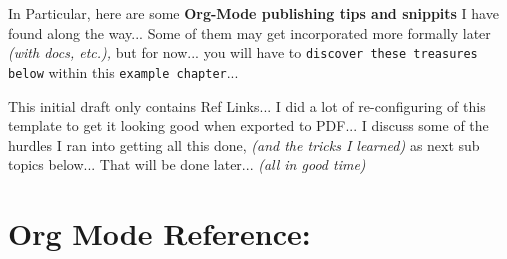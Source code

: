 \documentclass[openleft,oneside,showtrims]{memoir}
\begin{document}
In Particular, here are some \textbf{Org-Mode publishing tips and snippits} I have found along the way...  Some of them may get incorporated more formally later \emph{(with docs, etc.),} but for now... you will have to \texttt{discover these treasures below} within this \texttt{example chapter}...

This initial draft only contains Ref Links...  I did a lot of re-configuring of this template to get it looking good when exported to PDF...  I discuss some of the hurdles I ran into getting all this done, \emph{(and the tricks I learned)} as next sub topics below... That will be done later... \emph{(all in good time)}

\section{Org Mode Reference:}
\label{sec:org7fb6d70}
\label{TOPIC_org-mode-reference}
\end{document}
